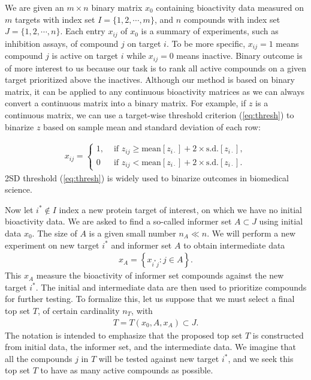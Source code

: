 \documentclass[12pt]{article}
\begin{document}
We are given an $m \times n$ binary matrix $x_0$ containing bioactivity data measured on $m$ targets with index set $I = \{1,2,\cdots,m\}$, and $n$ compounds with index set $J=\{1,2,\cdots,n\}$.  Each entry $x_{ij}$ of $x_0$ is a summary of experiments, such as inhibition assays,
of compound $j$ on target $i$. To be more specific, $x_{ij} = 1$ means compound $j$ is active on target $i$ while $x_{ij} = 0$ means inactive. Binary outcome is of more interest to us because our task is to rank all active compounds on a given target prioritized above the inactives. Although our method is based on binary matrix, it can be applied to any continuous bioactivity matrices as we can always convert a continuous matrix into a binary matrix. For example, if $z$ is a continuous matrix, we can use a target-wise threshold criterion (\ref{eq:thresh}) to binarize $z$ based on sample mean and standard deviation of each row:

\begin{eqnarray}\label{eq:thresh}
x_{ij} = \begin{cases}
		1, &\text{ if }
	      z_{ij} \geq \mbox{mean}[z_{i\cdot}] + 2 \times \mbox{s.d.}[z_{i\cdot}],\\
		0 & \text{ if }
	      z_{ij} < \mbox{mean}[z_{i\cdot}] + 2 \times \mbox{s.d.}[z_{i\cdot}].
	\end{cases}
\end{eqnarray}
2SD threshold (\ref{eq:thresh}) is widely used to binarize outcomes in biomedical science.  

Now let $i^* \notin I$ index a new protein target of interest, on which we have no initial bioactivity data.   
We are asked to find a so-called informer set $A \subset J$ using initial data $x_0$. The size of $A$ is a
given small number $n_A \ll n$. We will perform
a new experiment on new target $i^*$ and informer set $A$ to obtain intermediate data 
\begin{eqnarray*}
x_{A} = \left\{ x_{i^*j}: j \in A \right\}.
\end{eqnarray*}
This $x_A$ measure the bioactivity of informer
set compounds against the new target $i^*$.  The initial and intermediate
data are then used to prioritize compounds for further testing.
To formalize this, let us suppose that we must select a final
top set $T$, of certain cardinality $n_T$, with
\begin{eqnarray*}
T = T\left( x_0, A, x_A \right) \subset J.
\end{eqnarray*}
The notation is intended to emphasize that the proposed top set $T$ is constructed
from initial data, the informer set, and the intermediate data.
We imagine that all the compounds $j$ in $T$ will be
tested against new target $i^*$, and we seek this  top set $T$ to have as many
active compounds as possible.
\end{document}
